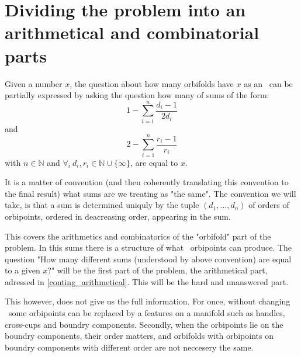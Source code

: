 


\section{Dividing the problem into an arithmetical and combinatorial parts}

Given a number $x$, the question about how many orbifolds have $x$ as an \Eoc\ can be 
partially expressed by asking the question how many of sums of the form:
\begin{equation}
1-\sum_{i=1}^n \frac{d_i-1}{2d_i}
\end{equation} 
and
\begin{equation}
2-\sum_{i=1}^n \frac{r_i-1}{r_i}
\end{equation}
with $n\in \mathbb{N}$ and $\forall_i\ d_i,r_i\in\mathbb{N}\cup\{\infty\}$, are equal to $x$. 

It is a matter of convention (and then coherently translating this convention to the final result) 
what sums are we treating as "the same". The convention we will take, is that a sum is determined 
uniquly by the tuple $(d_1,\dots,d_n)$  of orders 
of orbipoints, ordered in deacreasing order, appearing in the sum. 

This covers the arithmetics and combinatorics of the "orbifold" part of the problem. 
In this sums there is a structure of what \Eoc\ orbipoints can produce. 
The question "How many different sums (understood by above convention) are equal to a given $x$?" 
will be the first part of the problem, the arithmetical part, adressed in 
\ref{conting_arithmetical}. This will be the hard and unanswered part.

This however, does not give us the full information. For once, without changing \Eoc\ some 
orbipoints can be replaced by a features on a manifold such as handles, cross-cups and 
boundry components. Secondly, when the orbipoints lie on the boundry components, their 
order matters, and orbifolds with orbipoints on boundry components with different order 
are not neccesery the same. 

